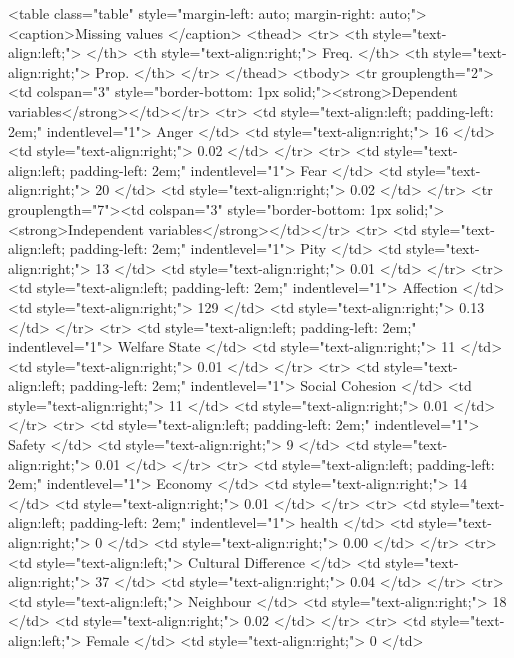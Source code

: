 <table class="table" style="margin-left: auto; margin-right: auto;">
<caption>Missing values \label{tab_missing}</caption>
 <thead>
  <tr>
   <th style="text-align:left;">   </th>
   <th style="text-align:right;"> Freq. </th>
   <th style="text-align:right;"> Prop. </th>
  </tr>
 </thead>
<tbody>
  <tr grouplength="2"><td colspan="3" style="border-bottom: 1px solid;"><strong>Dependent variables</strong></td></tr>
<tr>
   <td style="text-align:left; padding-left:  2em;" indentlevel="1"> Anger </td>
   <td style="text-align:right;"> 16 </td>
   <td style="text-align:right;"> 0.02 </td>
  </tr>
  <tr>
   <td style="text-align:left; padding-left:  2em;" indentlevel="1"> Fear </td>
   <td style="text-align:right;"> 20 </td>
   <td style="text-align:right;"> 0.02 </td>
  </tr>
  <tr grouplength="7"><td colspan="3" style="border-bottom: 1px solid;"><strong>Independent variables</strong></td></tr>
<tr>
   <td style="text-align:left; padding-left:  2em;" indentlevel="1"> Pity </td>
   <td style="text-align:right;"> 13 </td>
   <td style="text-align:right;"> 0.01 </td>
  </tr>
  <tr>
   <td style="text-align:left; padding-left:  2em;" indentlevel="1"> Affection </td>
   <td style="text-align:right;"> 129 </td>
   <td style="text-align:right;"> 0.13 </td>
  </tr>
  <tr>
   <td style="text-align:left; padding-left:  2em;" indentlevel="1"> Welfare State </td>
   <td style="text-align:right;"> 11 </td>
   <td style="text-align:right;"> 0.01 </td>
  </tr>
  <tr>
   <td style="text-align:left; padding-left:  2em;" indentlevel="1"> Social Cohesion </td>
   <td style="text-align:right;"> 11 </td>
   <td style="text-align:right;"> 0.01 </td>
  </tr>
  <tr>
   <td style="text-align:left; padding-left:  2em;" indentlevel="1"> Safety </td>
   <td style="text-align:right;"> 9 </td>
   <td style="text-align:right;"> 0.01 </td>
  </tr>
  <tr>
   <td style="text-align:left; padding-left:  2em;" indentlevel="1"> Economy </td>
   <td style="text-align:right;"> 14 </td>
   <td style="text-align:right;"> 0.01 </td>
  </tr>
  <tr>
   <td style="text-align:left; padding-left:  2em;" indentlevel="1"> health </td>
   <td style="text-align:right;"> 0 </td>
   <td style="text-align:right;"> 0.00 </td>
  </tr>
  <tr>
   <td style="text-align:left;"> Cultural Difference </td>
   <td style="text-align:right;"> 37 </td>
   <td style="text-align:right;"> 0.04 </td>
  </tr>
  <tr>
   <td style="text-align:left;"> Neighbour </td>
   <td style="text-align:right;"> 18 </td>
   <td style="text-align:right;"> 0.02 </td>
  </tr>
  <tr>
   <td style="text-align:left;"> Female </td>
   <td style="text-align:right;"> 0 </td>
